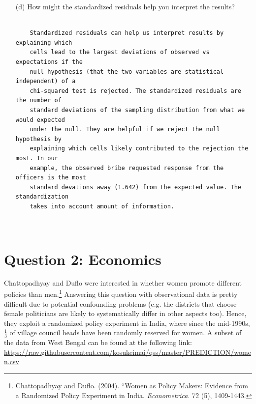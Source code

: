 \documentclass[12pt,letterpaper]{article}
\begin{document}
\begin{enumerate}
	\vspace{3cm}
	\item [(d)] How might the standardized residuals help you interpret the results?  
	
\begin{verbatim}
		
	Standardized residuals can help us interpret results by explaining which 
	cells lead to the largest deviations of observed vs expectations if the 
	null hypothesis (that the two variables are statistical independent) of a
	chi-squared test is rejected. The standardized residuals are the number of
	standard deviations of the sampling distribution from what we would expected
	under the null. They are helpful if we reject the null hypothesis by 
	explaining which cells likely contributed to the rejection the most. In our
	example, the observed bribe requested response from the officers is the most
	standard devations away (1.642) from the expected value. The standardization
	takes into account amount of information.
	
	
\end{verbatim}
	
\end{enumerate}
\newpage

\section*{Question 2: Economics}
Chattopadhyay and Duflo were interested in whether women promote different policies than men.\footnote{Chattopadhyay and Duflo. (2004). ``Women as Policy Makers: Evidence from a Randomized Policy Experiment in India. \textit{Econometrica}. 72 (5), 1409-1443.} Answering this question with observational data is pretty difficult due to potential confounding problems (e.g. the districts that choose female politicians are likely to systematically differ in other aspects too). Hence, they exploit a randomized policy experiment in India, where since the mid-1990s, $\frac{1}{3}$ of village council heads have been randomly reserved for women. A subset of the data from West Bengal can be found at the following link: \url{https://raw.githubusercontent.com/kosukeimai/qss/master/PREDICTION/women.csv}\\
\end{document}
